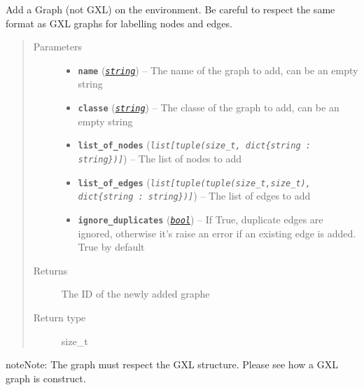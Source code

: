 \documentclass[letterpaper,10pt,english]{sphinxmanual}
\begin{document}
\begin{fulllineitems}
\label{doc:gedlibpy.add_random_graph}
Add a Graph (not GXL) on the environment. Be careful to respect the same format as GXL graphs for labelling nodes and edges.
\begin{quote}\begin{description}
\item[{Parameters}] \leavevmode\begin{itemize}
\item {} 
\textbf{\texttt{name}} (\href{https://docs.python.org/3/library/string.html\#module-string}{\emph{\texttt{string}}}) -- The name of the graph to add, can be an empty string

\item {} 
\textbf{\texttt{classe}} (\href{https://docs.python.org/3/library/string.html\#module-string}{\emph{\texttt{string}}}) -- The classe of the graph to add, can be an empty string

\item {} 
\textbf{\texttt{list\_of\_nodes}} (\emph{\texttt{list{[}tuple(size\_t, dict\{string : string\}){]}}}) -- The list of nodes to add

\item {} 
\textbf{\texttt{list\_of\_edges}} (\emph{\texttt{list{[}tuple(tuple(size\_t,size\_t), dict\{string : string\}){]}}}) -- The list of edges to add

\item {} 
\textbf{\texttt{ignore\_duplicates}} (\href{https://docs.python.org/3/library/functions.html\#bool}{\emph{\texttt{bool}}}) -- If True, duplicate edges are ignored, otherwise it's raise an error if an existing edge is added. True by default

\end{itemize}

\item[{Returns}] \leavevmode
The ID of the newly added graphe

\item[{Return type}] \leavevmode
size\_t

\end{description}\end{quote}

\begin{notice}{note}{Note:}
The graph must respect the GXL structure. Please see how a GXL graph is construct.
\end{notice}

\end{fulllineitems}
\end{document}
